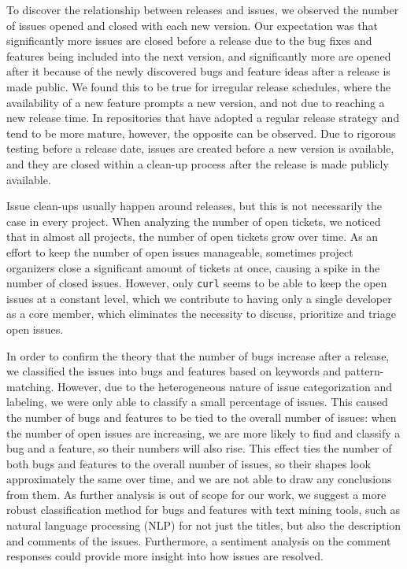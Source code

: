 To discover the relationship between releases and issues, we observed the number of issues opened and closed with each new version. Our expectation was that significantly more issues are closed before a release due to the bug fixes and features being included into the next version, and significantly more are opened after it because of the newly discovered bugs and feature ideas after a release is made public. We found this to be true for irregular release schedules, where the availability of a new feature prompts a new version, and not due to reaching a new release time. In repositories that have adopted a regular release strategy and tend to be more mature, however, the opposite can be observed. Due to rigorous testing before a release date, issues are created before a new version is available, and they are closed within a clean-up process after the release is made publicly available.

Issue clean-ups usually happen around releases, but this is not necessarily the case in every project. When analyzing the number of open tickets, we noticed that in almost all projects, the number of open tickets grow over time. As an effort to keep the number of open issues manageable, sometimes project organizers close a significant amount of tickets at once, causing a spike in the number of closed issues. However, only \texttt{curl} seems to be able to keep the open issues at a constant level, which we contribute to having only a single developer as a core member, which eliminates the necessity to discuss, prioritize and triage open issues.

In order to confirm the theory that the number of bugs increase after a release, we classified the issues into bugs and features based on keywords and pattern-matching. However, due to the heterogeneous nature of issue categorization and labeling, we were only able to classify a small percentage of issues. This caused the number of bugs and features to be tied to the overall number of issues: when the number of open issues are increasing, we are more likely to find and classify a bug and a feature, so their numbers will also rise. This effect ties the number of both bugs and features to the overall number of issues, so their shapes look approximately the same over time, and we are not able to draw any conclusions from them. As further analysis is out of scope for our work, we suggest a more robust classification method for bugs and features with text mining tools, such as natural language processing (NLP) for not just the titles, but also the description and comments of the issues. Furthermore, a sentiment analysis on the comment responses could provide more insight into how issues are resolved.

